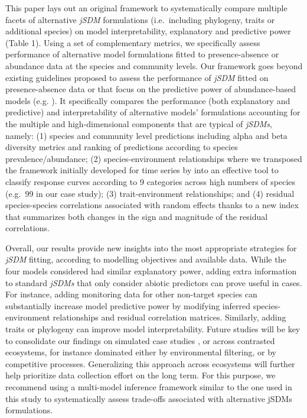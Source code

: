 \documentclass[9pt,biorxiv,doublespacing,lineno]{lapreprint}
\begin{document}
This paper lays out an original framework to systematically compare
multiple facets of alternative \emph{jSDM} formulations (i.e.~including
phylogeny, traits or additional species) on model interpretability,
explanatory and predictive power (Table 1). Using a set of complementary
metrics, we specifically assess performance of alternative model
formulations fitted to presence-absence or abundance data at the species
and community levels. Our framework goes beyond existing guidelines
proposed to assess the performance of \emph{jSDM} fitted on
presence-absence data \autocite{Wilkinson_2020} or that focus on the
predictive power of abundance-based models (e.g.
\textcite{Waldock_2022}). It specifically compares the performance (both
explanatory and predictive) and interpretability of alternative models'
formulations accounting for the multiple and high-dimensional components
that are typical of \emph{jSDMs}, namely: (1) species and community
level predictions including alpha and beta diversity metrics and ranking
of predictions according to species prevalence/abundance; (2)
species-environment relationships where we transposed the framework
initially developed for time series by \textcite{Rigal_2020} into an
effective tool to classify response curves according to 9 categories
across high numbers of species (e.g.~99 in our case study); (3)
trait-environment relationships; and (4) residual species-species
correlations associated with random effects thanks to a new index that
summarizes both changes in the sign and magnitude of the residual
correlations.

Overall, our results provide new insights into the most appropriate
strategies for \emph{jSDM} fitting, according to modelling objectives
\autocite{Tredennick_2021} and available data. While the four models
considered had similar explanatory power, adding extra information to
standard \emph{jSDMs} that only consider abiotic predictors can prove
useful in cases. For instance, adding monitoring data for other
non-target species can substantially increase model predictive power by
modifying inferred species-environment relationships and residual
correlation matrices. Similarly, adding traits or phylogeny can improve
model interpretability. Future studies will be key to consolidate our
findings on simulated case studies \autocites[
]{Zurell_2010}{DiRenzo_2022}, or across contrasted ecosystems, for
instance dominated either by environmental filtering, or by competitive
processes. Generalizing this approach across ecosystems will further
help prioritize data collection effort on the long term. For this
purpose, we recommend using a multi-model inference framework similar to
the one used in this study to systematically assess trade-offs
associated with alternative jSDMs formulations.
\end{document}
